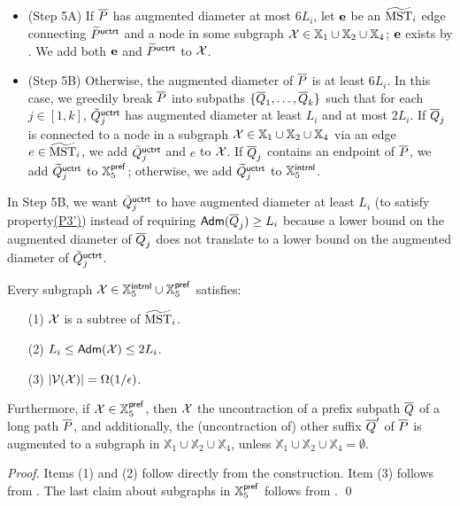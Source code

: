 \begin{itemize}
	\item (Step 5A)\hypertarget{5A}{}  If $\overline{P}$ has augmented diameter at most $6L_i$, let $\mathbf{e}$ be an $\widetilde{\mathrm{MST}}_i$ edge connecting $\widetilde{P}^{\mathsf{uctrt}}$  and a node in some subgraph $\mathcal{X} \in \mathbb{X}_1\cup \mathbb{X}_2 \cup \mathbb{X}_4$; $\mathbf{e}$ exists by . We add both $\mathbf{e}$ and $\widetilde{P}^{\mathsf{uctrt}}$ to $\mathcal{X}$.
	\item (Step 5B)\hypertarget{5B}{} 	Otherwise,  the augmented diameter of $\overline{P}$ is at least $6L_i$. In this case, we greedily break $\overline{P}$ into subpaths $\{\overline{Q}_1,\ldots, \overline{Q}_k\}$ such that for each $j\in [1,k]$, $\tilde{Q}^{\mathsf{uctrt}}_j$ has augmented diameter at least $L_i$ and at most $2L_i$.  If $\overline{Q}_j$ is connected to a node in a subgraph $\mathcal{X} \in \mathbb{X}_1 \cup \mathbb{X}_2\cup \mathbb{X}_4$ via an  edge $e\in \widetilde{\mathrm{MST}}_{i}$, we add $\tilde{Q}^{\mathsf{uctrt}}_j$ and $e$ to $\mathcal{X}$.	If $\overline{Q}_j$ contains an endpoint of $\overline{P}$, we add $\widetilde{Q}_j^{\mathsf{uctrt}}$ to $\mathbb{X}^{\mathsf{pref}}_5$; otherwise, we add  $\widetilde{Q}_j^{\mathsf{uctrt}}$ to $\mathbb{X}^{\mathsf{intrnl}}_5$. 
\end{itemize}

In Step 5B, we want $\tilde{Q}_j^{\mathsf{uctrt}}$ to have augmented diameter at least $L_i$ (to satisfy property\hyperlink{P3'}{(P3')})  instead of  requiring $\mathsf{Adm}(\overline{Q}_j) \geq L_i$ because a lower bound on the augmented diameter of $\overline{Q}_j$ does not translate to a lower bound on the augmented diameter of $\tilde{Q}^{\mathsf{uctrt}}_j$.


\begin{lemma}\label{lm:Clustering-Step5}  Every subgraph $\mathcal{X} \in \mathbb{X}_5^{\mathsf{intrnl}} \cup \mathbb{X}_5^{\mathsf{pref}}$ satisfies:
	\begin{enumerate}[noitemsep]
		\item[(1)] $\mathcal{X}$ is a subtree of $\widetilde{\mathrm{MST}}_{i}$.
		\item[(2)] $L_i \leq \mathsf{Adm}(\mathcal{X})\leq 2 L_i$.
		\item[(3)] $|\mathcal{V}(\mathcal{X})| = \Omega(1/\epsilon)$.
	\end{enumerate}
Furthermore, if $\mathcal{X} \in \mathbb{X}_5^{\mathsf{pref}}$, then $\mathcal{X}$ the uncontraction of a prefix subpath $\overline{Q}$ of a long path $\overline{P}$, and additionally, the (uncontraction of) other suffix $\overline{Q}'$ of   $\overline{P}$ is augmented to a subgraph in $\mathbb{X}_1 \cup \mathbb{X}_2\cup \mathbb{X}_4$, unless $\mathbb{X}_1 \cup \mathbb{X}_2\cup \mathbb{X}_4 = \emptyset$.
\end{lemma}
\begin{proof} 
	Items (1) and (2) follow directly from the construction. Item (3) follows  from .  The last claim about subgraphs in  $\mathbb{X}_5^{\mathsf{pref}}$ follows from .
	 \qed
\end{proof}



